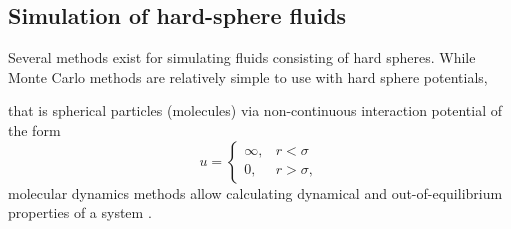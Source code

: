 \subsection{Simulation of hard-sphere fluids}
Several methods exist for simulating fluids consisting of hard spheres.
While Monte Carlo methods are relatively simple to use with hard sphere potentials, 

that is spherical particles (molecules) via non-continuous interaction potential of the form
\begin{equation}
    u = 
    \begin{cases}
        \infty, & r < \sigma \\
        0, & r > \sigma,
    \end{cases}
\end{equation}
molecular dynamics methods allow calculating dynamical and out-of-equilibrium properties of a system \cite{ref:allen:MD_sim}.

